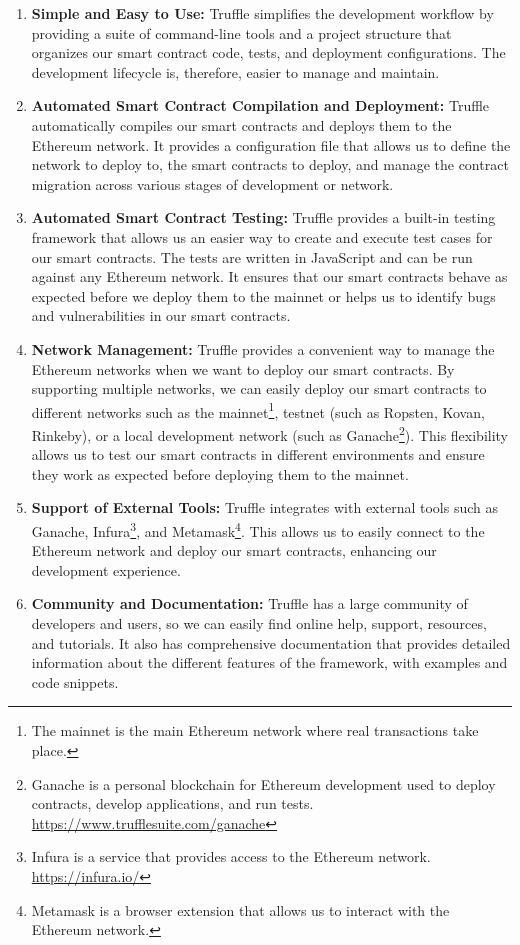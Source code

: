 \begin{enumerate}
  \item \textbf{Simple and Easy to Use:}  Truffle simplifies the development workflow by providing a suite of command-line tools and a project structure that
        organizes our smart contract code, tests, and deployment configurations. The development lifecycle is, therefore, easier to manage and maintain.
  \item \textbf{Automated Smart Contract Compilation and Deployment:} Truffle automatically compiles our smart contracts and deploys them to the Ethereum network.
        It provides a configuration file that allows us to define the network to deploy to, the smart contracts to deploy, and manage the contract migration across various
        stages of development or network.
  \item \textbf{Automated Smart Contract Testing:} Truffle provides a built-in testing framework that allows us an easier way to create and execute test cases
        for our smart contracts. The tests are written in JavaScript and can be run against any Ethereum network. It ensures that our smart contracts behave as expected
        before we deploy them to the mainnet or helps us to identify bugs and vulnerabilities in our smart contracts.
  \item \textbf{Network Management:} Truffle provides a convenient way to manage the Ethereum networks when we want to deploy our smart contracts. By supporting
        multiple networks, we can easily deploy our smart contracts to different networks such as the mainnet\footnote{The mainnet is the main Ethereum network where real transactions take place.},
        testnet (such as Ropsten, Kovan, Rinkeby), or a local development network (such as Ganache\footnote{Ganache is a personal blockchain for Ethereum development
            used to deploy contracts, develop applications, and run tests. \url{https://www.trufflesuite.com/ganache}}). This flexibility allows us to test our smart contracts in different environments and ensure
        they work as expected before deploying them to the mainnet.
  \item \textbf{Support of External Tools:} Truffle integrates with external tools such as Ganache, Infura\footnote{Infura is a service that provides access to the Ethereum network. \url{https://infura.io/}},
        and Metamask\footnote{Metamask is a browser extension that allows us to interact with the Ethereum network.}. This allows us to easily connect to the Ethereum
        network and deploy our smart contracts, enhancing our development experience.
  \item \textbf{Community and Documentation:} Truffle has a large community of developers and users, so we can easily find online help, support, resources,
        and tutorials. It also has comprehensive documentation that provides detailed information about the different features of the framework, with examples
        and code snippets.
\end{enumerate}


